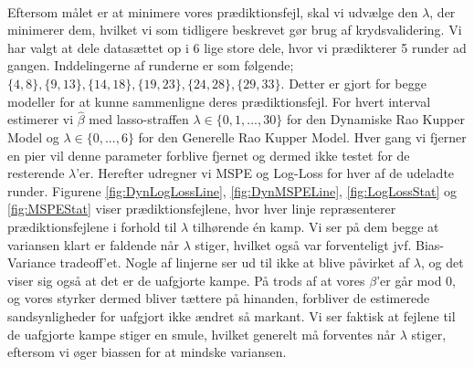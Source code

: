 \documentclass[11pt,a4paper]{article}
\begin{document}
\\Eftersom målet er at minimere vores prædiktionsfejl, skal vi udvælge den $\lambda$, der minimerer dem, hvilket vi som tidligere beskrevet gør brug af krydsvalidering. Vi har valgt at dele datasættet op i 6 lige store dele, hvor vi prædikterer 5 runder ad gangen. Inddelingerne af runderne er som følgende; $\{4,8\},\{9,13\},\{14,18\},\{19,23\},\{24,28\},\{29,33\}$. Detter er gjort for begge modeller for at kunne sammenligne deres prædiktionsfejl. For hvert interval estimerer vi $\hat{\beta}$ med lasso-straffen $\lambda \in \{0,1,...,30\}$ for den Dynamiske Rao Kupper Model og $\lambda \in \{0,...,6\}$ for den Generelle Rao Kupper Model. Hver gang vi fjerner en pier vil denne parameter forblive fjernet og dermed ikke testet for de resterende $\lambda$'er. Herefter udregner vi MSPE og Log-Loss for hver af de udeladte runder. Figurene \ref{fig:DynLogLossLine},  \ref{fig:DynMSPELine}, \ref{fig:LogLossStat} og \ref{fig:MSPEStat} viser prædiktionsfejlene, hvor hver linje repræsenterer prædiktionsfejlene i forhold til $\lambda$ tilhørende én kamp. Vi ser på dem begge at variansen klart er faldende når $\lambda$ stiger, hvilket også var forventeligt jvf. Bias-Variance tradeoff'et. Nogle af linjerne ser ud til ikke at blive påvirket af $\lambda$, og det viser sig også at det er de uafgjorte kampe. På trods af at vores $\beta$'er går mod $0$, og vores styrker dermed bliver tættere på hinanden, forbliver de estimerede sandsynligheder for uafgjort ikke ændret så markant. Vi ser faktisk at fejlene til de uafgjorte kampe stiger en smule, hvilket generelt må forventes når $\lambda$ stiger, eftersom vi øger biassen for at mindske variansen. \\
\end{document}
